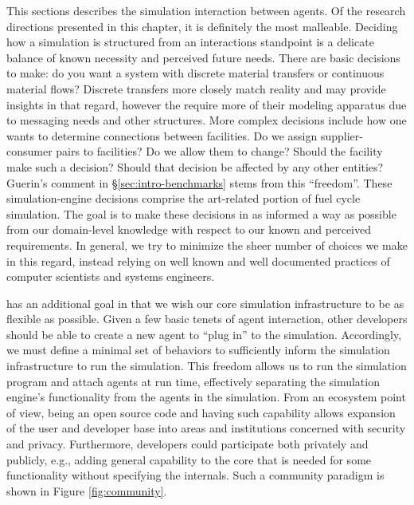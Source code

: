 This sections describes the simulation interaction between agents. Of the
research directions presented in this chapter, it is definitely the most
malleable. Deciding how a simulation is structured from an interactions
standpoint is a delicate balance of known necessity and perceived future
needs. There are basic decisions to make: do you want a system with discrete
material transfers or continuous material flows? Discrete transfers more closely
match reality and may provide insights in that regard, however the require more
of their modeling apparatus due to messaging needs and other structures. More
complex decisions include how one wants to determine connections between
facilities. Do we assign supplier-consumer pairs to facilities? Do we allow them
to change? Should the facility make such a decision? Should that decision be
affected by any other entities? Guerin's comment in \S\ref{sec:intro-benchmarks}
stems from this ``freedom''. These simulation-engine decisions comprise the
art-related portion of fuel cycle simulation. The goal is to make these
decisions in as informed a way as possible from our domain-level knowledge with
respect to our known and perceived requirements. In general, we try to minimize
the sheer number of choices we make in this regard, instead relying on well
known and well documented practices of computer scientists and systems
engineers.

\Cyclus has an additional goal in that we wish our core simulation
infrastructure to be as flexible as possible. Given a few basic tenets of agent
interaction, other developers should be able to create a new agent to ``plug
in'' to the simulation. Accordingly, we must define a minimal set of behaviors
to sufficiently inform the simulation infrastructure to run the simulation. This
freedom allows us to run the simulation program and attach agents at run time,
effectively separating the simulation engine's functionality from the agents in
the simulation. From an ecosystem point of view, being an open source code and
having such capability allows expansion of the user and developer base into
areas and institutions concerned with security and privacy. Furthermore,
developers could participate both privately and publicly, e.g., adding general
capability to the \Cyclus core that is needed for some functionality without
specifying the internals. Such a community paradigm is shown in Figure
\ref{fig:community}.

